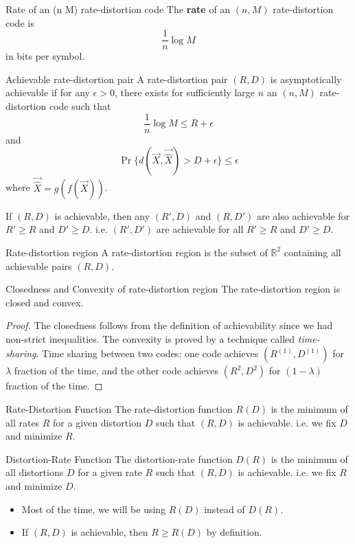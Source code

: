 \documentclass[../main.tex]{subfiles}
\begin{document}
\begin{gbox}{Rate of an (n M) rate-distortion code}
    The \textbf{rate} of an $(n,M)$ rate-distortion code is \[
    \frac{1}{n}\log M
    \] in bits per symbol.
\end{gbox}
\begin{gbox}{Achievable rate-distortion pair}
A rate-distortion pair $(R,D)$ is asymptotically achievable if for any $\epsilon > 0$, there exists for sufficiently large $n$ an $(n,M)$ rate-distortion code such that \[
\frac{1}{n}\log M \leq R+\epsilon
\] and \[
\Pr\{d(\vec X, \vec{\hat X}) > D+\epsilon\}\leq \epsilon
\] where $\vec{\hat X} = g(f(\vec X))$.
\begin{remark}
    If $(R,D)$ is achievable, then any $(R',D)$ and $(R,D')$ are also achievable for $R'\geq R$ and $D'\geq D$. i.e. $(R',D')$ are achievable for all $R'\geq R$ and $D'\geq D$.
\end{remark}
\end{gbox}
\begin{gbox}{Rate-distortion region}
A rate-distortion region is the subset of $\mathbb{R}^2$ containing all achievable pairs $(R,D)$.
\end{gbox}
\begin{bbox}{Closedness and Convexity of rate-distortion region}
    The rate-distortion region is closed and convex.
    \begin{proof}
        The closedness follows from the definition of achievability since we had non-strict inequalities. The convexity is proved by a technique called \textit{time-sharing}. 
        \newline
        Time sharing between two codes: one code achieves $(R^{(1)},D^{(1)})$ for $\lambda$ fraction of the time, and the other code achieves $(R^2,D^2)$ for $(1-\lambda)$ fraction of the time.
    \end{proof}
\end{bbox}
\begin{gbox}{Rate-Distortion Function}
    The rate-distortion function $R(D)$ is the minimum of all rates $R$ for a given distortion $D$ such that $(R,D)$ is achievable. 
    \newline
    i.e. we fix $D$ and minimize $R$.
\end{gbox}
\begin{gbox}{Distortion-Rate Function}
    The distortion-rate function $D(R)$ is the minimum of all distortions $D$ for a given rate $R$ such that $(R,D)$ is achievable.
    \newline
    i.e. we fix $R$ and minimize $D$.
\end{gbox}
\begin{remark}
    \begin{itemize}
        \item Most of the time, we will be using $R(D)$ instead of $D(R)$.
        \item If $(R,D)$ is achievable, then $R\geq R(D)$ by definition.
    \end{itemize}
\end{remark}
\end{document}
